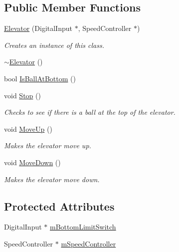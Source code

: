 \subsection*{\-Public \-Member \-Functions}
\begin{DoxyCompactItemize}
\item 
\hyperlink{class_elevator_adc00b0e1820bfefcf7c09015fe8e848c}{\-Elevator} (\-Digital\-Input $\ast$, \-Speed\-Controller $\ast$)
\begin{DoxyCompactList}\small\item\em \-Creates an instance of this class. \end{DoxyCompactList}\item 
\hyperlink{class_elevator_a6e2fb71cfcde094c087b8a19a8bcab4b}{$\sim$\-Elevator} ()
\item 
bool \hyperlink{class_elevator_a458b763a246ca3d792a204656234c3bb}{\-Is\-Ball\-At\-Bottom} ()
\item 
void \hyperlink{class_elevator_a0b5ef4805646fd221e6d048cd7ceecf6}{\-Stop} ()
\begin{DoxyCompactList}\small\item\em \-Checks to see if there is a ball at the top of the elevator. \end{DoxyCompactList}\item 
void \hyperlink{class_elevator_a4d1771aa38cdd521b0a49bab5b73fc50}{\-Move\-Up} ()
\begin{DoxyCompactList}\small\item\em \-Makes the elevator move up. \end{DoxyCompactList}\item 
void \hyperlink{class_elevator_adca8651a978896e9d6c39b2dbda293b8}{\-Move\-Down} ()
\begin{DoxyCompactList}\small\item\em \-Makes the elevator move down. \end{DoxyCompactList}\end{DoxyCompactItemize}
\subsection*{\-Protected \-Attributes}
\begin{DoxyCompactItemize}
\item 
\-Digital\-Input $\ast$ \hyperlink{class_elevator_af2172b0f50fc8302a990e031613a4550}{m\-Bottom\-Limit\-Switch}
\item 
\-Speed\-Controller $\ast$ \hyperlink{class_elevator_a6d56aabc546f914c00a1c21ef72d2864}{m\-Speed\-Controller}
\end{DoxyCompactItemize}
